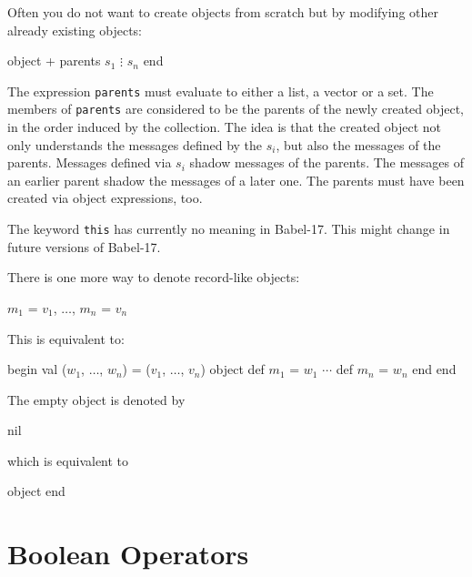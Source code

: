 \documentclass[11pt]{amsart}
\newcommand{\babelsrc}[1] {\lstinline!#1!}
\begin{document}
Often you do not want to create objects from scratch but by modifying other already existing objects:
\begin{babellisting}
object + parents
  $s_1$
  $\vdots$
  $s_n$
end
\end{babellisting}
The expression \babelsrc{parents} must evaluate to either a list, a vector or a set. The members of  \babelsrc{parents}
are considered to be the parents of the newly created object, in the order induced by the collection. The idea is that the created object not only understands the messages defined by the $s_i$, but also the messages of the parents. Messages defined via $s_i$ shadow messages of the parents. The messages of an earlier parent shadow the messages of a later one. The parents must have been created via object expressions, too. 

The keyword \babelsrc{this} has currently no meaning in Babel-17. This might change in future versions of Babel-17.

\noindent There is one more way to denote record-like objects:
\begin{babellisting}
{ $m_1$ = $v_1$, $\ldots$, $m_n$ = $v_n$ }
\end{babellisting}
This is equivalent to:
\begin{babellisting}
begin
  val ($w_1$, $\ldots$, $w_n$) = ($v_1$, $\ldots$, $v_n$)
  object
    def $m_1$ = $w_1$
    $\cdots$
    def $m_n$ = $w_n$
  end
end
\end{babellisting}
The empty object is denoted by
\begin{babellisting}
nil
\end{babellisting}
which is equivalent to
\begin{babellisting}
object end
\end{babellisting}


\section{Boolean Operators}
\end{document}
